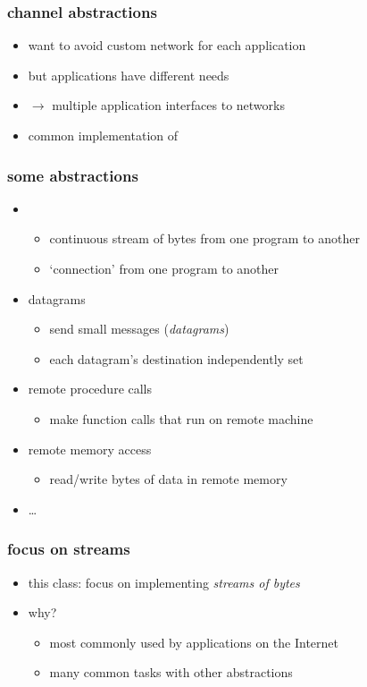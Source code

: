 \begin{frame}\frametitle{channel abstractions}
\begin{itemize}
    \item want to avoid custom network for each application
    \item but applications have different needs
    \vspace{.5cm}
    \item $\rightarrow$ multiple application interfaces to networks
    \item common implementation of 
\end{itemize}
\end{frame}

\begin{frame}\frametitle{some abstractions}
    \begin{itemize}
    \item {}
        \begin{itemize}
        \item continuous stream of bytes from one program to another
        \item `connection' from one program to another
        \end{itemize}
    \item datagrams
        \begin{itemize}
        \item send small messages (\textit{datagrams})
        \item each datagram's destination independently set
        \end{itemize}
    \item remote procedure calls
        \begin{itemize}
        \item make function calls that run on remote machine
        \end{itemize}
    \item remote memory access
        \begin{itemize}
        \item read/write bytes of data in remote memory
        \end{itemize}
    \item \ldots
    \end{itemize}
\end{frame}

\begin{frame}\frametitle{focus on streams}
    \begin{itemize}
    \item this class: focus on implementing \textit{streams of bytes}
    \vspace{.5cm}
    \item why?
        \begin{itemize}
        \item most commonly used by applications on the Internet
        \item many common tasks with other abstractions
        \end{itemize}
    \end{itemize}
\end{frame}
